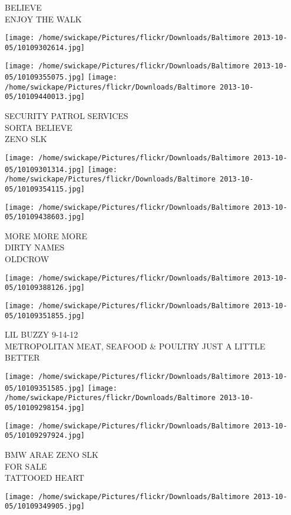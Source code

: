 \documentclass[10pt,letterpaper]{article}
\begin{document}
BELIEVE\\
ENJOY THE WALK
\pagebreak

\texttt{[image: /home/swickape/Pictures/flickr/Downloads/Baltimore 2013-10-05/10109302614.jpg]}

\vspace{0.25in}
\texttt{[image: /home/swickape/Pictures/flickr/Downloads/Baltimore 2013-10-05/10109355075.jpg]}
\texttt{[image: /home/swickape/Pictures/flickr/Downloads/Baltimore 2013-10-05/10109440013.jpg]}

SECURITY PATROL SERVICES\\
SORTA BELIEVE\\
ZENO SLK
\pagebreak

\texttt{[image: /home/swickape/Pictures/flickr/Downloads/Baltimore 2013-10-05/10109301314.jpg]}
\texttt{[image: /home/swickape/Pictures/flickr/Downloads/Baltimore 2013-10-05/10109354115.jpg]}

\texttt{[image: /home/swickape/Pictures/flickr/Downloads/Baltimore 2013-10-05/10109438603.jpg]}

MORE MORE MORE\\
DIRTY NAMES\\
OLDCROW
\pagebreak

\texttt{[image: /home/swickape/Pictures/flickr/Downloads/Baltimore 2013-10-05/10109388126.jpg]}

\vspace{0.25in}
\texttt{[image: /home/swickape/Pictures/flickr/Downloads/Baltimore 2013-10-05/10109351855.jpg]}

LIL BUZZY 9{-}14{-}12\\
METROPOLITAN MEAT, SEAFOOD \& POULTRY JUST A LITTLE BETTER
\pagebreak

\texttt{[image: /home/swickape/Pictures/flickr/Downloads/Baltimore 2013-10-05/10109351585.jpg]}
\texttt{[image: /home/swickape/Pictures/flickr/Downloads/Baltimore 2013-10-05/10109298154.jpg]}

\texttt{[image: /home/swickape/Pictures/flickr/Downloads/Baltimore 2013-10-05/10109297924.jpg]}

BMW ARAE ZENO SLK\\
FOR SALE\\
TATTOOED HEART
\pagebreak

\texttt{[image: /home/swickape/Pictures/flickr/Downloads/Baltimore 2013-10-05/10109349905.jpg]}
\end{document}
